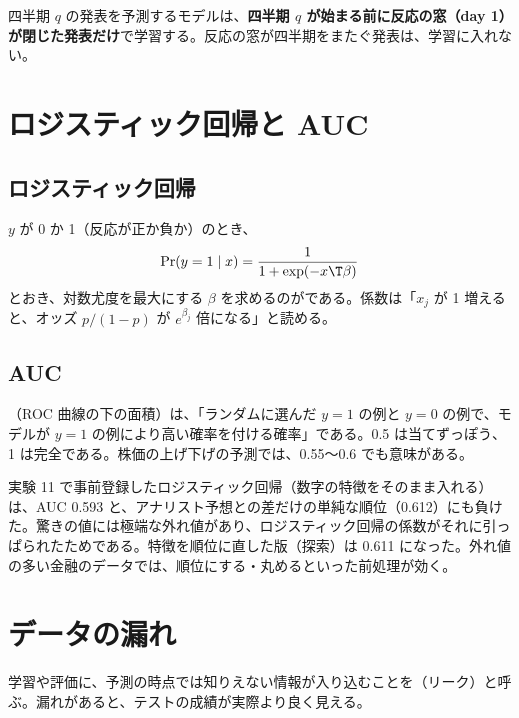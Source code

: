 \begin{defbox}[この研究の決まり]
四半期 $q$ の発表を予測するモデルは、\textbf{四半期 $q$ が始まる前に反応の窓（day 1）が閉じた発表だけ}で学習する。反応の窓が四半期をまたぐ発表は、学習に入れない。
\end{defbox}

\section{ロジスティック回帰と AUC}

\subsection{ロジスティック回帰}

$y$ が 0 か 1（反応が正か負か）のとき、
\begin{equation}
\Pr(y=1\mid x) = \frac{1}{1+\exp(-x\T\beta)}
\end{equation}
とおき、対数尤度を最大にする $\beta$ を求めるのがである。係数は「$x_j$ が 1 増えると、オッズ $p/(1-p)$ が $e^{\beta_j}$ 倍になる」と読める。

\subsection{AUC}

（ROC 曲線の下の面積）は、「ランダムに選んだ $y=1$ の例と $y=0$ の例で、モデルが $y=1$ の例により高い確率を付ける確率」である。0.5 は当てずっぽう、1 は完全である。株価の上げ下げの予測では、0.55〜0.6 でも意味がある。

\begin{notebox}[外れ値に弱い]
実験 11 で事前登録したロジスティック回帰（数字の特徴をそのまま入れる）は、AUC 0.593 と、アナリスト予想との差だけの単純な順位（0.612）にも負けた。驚きの値には極端な外れ値があり、ロジスティック回帰の係数がそれに引っぱられたためである。特徴を順位に直した版（探索）は 0.611 になった。外れ値の多い金融のデータでは、順位にする・丸めるといった前処理が効く。
\end{notebox}

\section{データの漏れ}

学習や評価に、予測の時点では知りえない情報が入り込むことを（リーク）と呼ぶ。漏れがあると、テストの成績が実際より良く見える。

